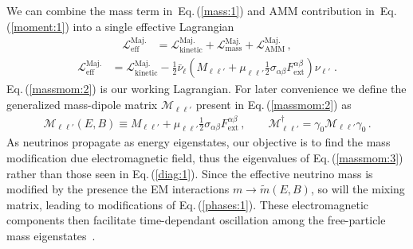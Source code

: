 \documentclass{ws-ijmpa}
\newcommand{\req}[1]{Eq.\,(\ref{#1})}
\begin{document}
We can combine the mass term in~\req{mass:1} and AMM contribution in~\req{moment:1} into a single effective Lagrangian
\begin{align}
\label{massmom:1}
\mathcal{L}_\mathrm{eff}^\mathrm{Maj.} &= \mathcal{L}_\mathrm{kinetic}^\mathrm{Maj.} + \mathcal{L}_\mathrm{mass}^\mathrm{Maj.} + \mathcal{L}_\mathrm{AMM}^\mathrm{Maj.}\,,
\end{align}
%
\begin{align}
\label{massmom:2}
\mathcal{L}_\mathrm{eff}^\mathrm{Maj.} &= \mathcal{L}_\mathrm{kinetic}^\mathrm{Maj.} - \frac{1}{2}\bar\nu_{\ell}\left(M_{\ell\ell'}+\mu_{\ell\ell'}\frac{1}{2}\sigma_{\alpha\beta}F^{\alpha\beta}_\mathrm{ext}\right)\nu_{\ell'}\;.
\end{align}
\req{massmom:2} is our working Lagrangian. For later convenience we define the generalized mass-dipole matrix $\mathcal{M}_{\ell\ell'}$ present in \req{massmom:2} as
\begin{align}
\label{massmom:3}
\mathcal{M}_{\ell\ell'}(E,B)\equiv M_{\ell\ell'}+\mu_{\ell\ell'}\frac{1}{2}\sigma_{\alpha\beta}F^{\alpha\beta}_\mathrm{ext}\,,\qquad \mathcal{M}_{\ell\ell'}^{\dag}=\gamma_{0}\mathcal{M}_{\ell\ell'}\gamma_{0}\,.
\end{align}
As neutrinos propagate as energy eigenstates, our objective is to find the mass modification due electromagnetic field, thus the eigenvalues of \req{massmom:3} rather than those seen in \req{diag:1}. Since the effective neutrino mass is modified by the presence the EM interactions $m\rightarrow\widetilde m(E,B)$, so will the mixing matrix, leading to modifications of \req{phases:1}. These electromagnetic components then facilitate time-dependant oscillation among the free-particle mass eigenstates~\cite{Giunti:2014ixa}.

\end{document}

